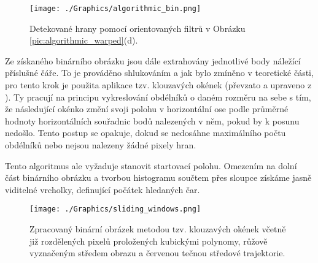 \documentclass[czech, bc, kky, he, iso690numb]{fasthesis}
\begin{document}
            		\begin{figure}[h]
            			\centering
            			\texttt{[image: ./Graphics/algorithmic\_bin.png]}
            			\caption{Detekované hrany pomocí orientovaných filtrů v Obrázku \ref{pic:algorithmic_warped}(d).}
            			\label{pic:algorithmic_bin}
            		\end{figure}
            	
            	Ze získaného binárního obrázku jsou dále extrahovány jednotlivé body náležící příslušné čáře. To je prováděno shlukováním a jak bylo zmíněno v teoretické části, pro tento krok je použita aplikace tzv. klouzavých okének (převzato a upraveno z \cite{sliding_window}). Ty pracují na principu vykreslování obdélníků o daném rozměru na sebe s tím, že následující okénko změní svoji polohu v horizontální ose podle průměrné hodnoty horizontálních souřadnic bodů nalezených v něm, pokud by k posunu nedošlo. Tento postup se opakuje, dokud se nedosáhne maximálního počtu obdélníků nebo nejsou nalezeny žádné pixely hran.
            	
            	Tento algoritmus ale vyžaduje stanovit startovací polohu. Omezením na dolní část binárního obrázku a tvorbou histogramu součtem přes sloupce získáme jasně viditelné vrcholky, definující počátek hledaných čar.
            	
            		\begin{figure}[h]
            			\centering
            			\texttt{[image: ./Graphics/sliding\_windows.png]}
            			\caption{Zpracovaný binární obrázek metodou tzv. klouzavých okének včetně již rozdělených pixelů proložených kubickými polynomy, růžově vyznačeným středem obrazu a červenou tečnou středové trajektorie.}
            			\label{pic:sliding_windows}
            		\end{figure}
            	
\end{document}
